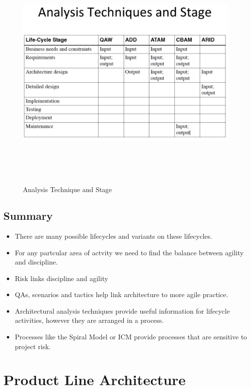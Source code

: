 \documentclass{report}
\begin{document}
\begin{figure}[h]
\begin{center} 
    \includegraphics[scale=0.8,width = 15cm, height = 12cm]{images/Analysis2.pdf}
    \caption{Analysis Technique and Stage}
\end{center}
\end{figure}

\section{Summary}
\begin{itemize}
\item There are	many possible lifecycles and variants on	
these lifecycles.	
\item For any partcular	area of	actvity	we need to find the	
balance	between	agility	and	discipline.	
\item  Risk	links	discipline	and	agility	
\item QAs, scenarios and tactics help link architecture to	
more agile practice.	
\item Architectural	analysis techniques	provide	useful	
information for lifecycle activities, however they are	
arranged in	a process.	
\item Processes	like the Spiral	Model or ICM provide	
processes that are	sensitive to project risk.
\end{itemize}

\chapter{Product Line Architecture}
\end{document}
